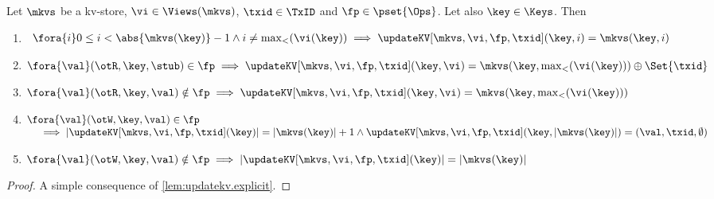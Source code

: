 \begin{corollary}
\label{cor:updatekv.singlecell}
Let $\mkvs$ be a kv-store, $\vi \in \Views(\mkvs)$, $\txid \in \TxID$ and $\fp \in \pset{\Ops}$. 
Let also $\key \in \Keys$. Then 
\begin{enumerate}
\item\label{item:updatekv.singlecell.noview} 
    $ 
    \begin{array}[t]{l}
        \fora{ i } 0 \leq i < \abs{\mkvs(\key) } - 1 \land i \neq \max_{<}(\vi(\key)) 
        \implies \updateKV[\mkvs, \vi, \fp, \txid](\key, i) = \mkvs(\key, i)
    \end{array}
    $
\item\label{item:updatekv.singlecell.rd} $\fora{ \val } (\otR, \key, \stub) \in \fp \implies \updateKV[\mkvs,\vi, \fp,\txid](\key, \vi) = \mkvs(\key, \max_{<}(\vi(\key))) \oplus \Set{\txid}$
\item\label{item:updatekv.singlecell.nord} $\fora{ \val } (\otR,\key, \val) \notin \fp \implies \updateKV[\mkvs,\vi, \fp,\txid](\key,\vi) = \mkvs(\key, \max_{<}(\vi(\key)))$
\item\label{item:updatekv.singlecell.wr} 
    $\begin{array}[t]{@{}l@{}}
        \fora{\val} (\otW, \key, \val) \in \fp \\
        \quad {} \implies
        \lvert \updateKV[\mkvs,\vi,\fp,\txid](\key) \rvert = 
        \lvert \mkvs(\key) \rvert + 1 \wedge
        \updateKV[\mkvs,\vi,\fp,\txid](\key, \lvert \mkvs(\key) \rvert) = (\val, \txid, \emptyset)
    \end{array}$
\item\label{item:updatekv.singlecell.nowr} $\fora{ \val } (\otW, \key, \val) \notin \fp \implies \lvert \updateKV[\mkvs,\vi,\fp,\txid](\key) \rvert = \lvert \mkvs(\key) \rvert$
\end{enumerate}
\end{corollary}

\begin{proof}
A simple consequence of \cref{lem:updatekv.explicit}.
\end{proof}
